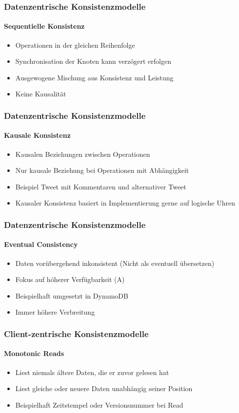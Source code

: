 \begin{frame}
  \frametitle{Datenzentrische Konsistenzmodelle}
  \framesubtitle{Sequentielle Konsistenz}
  \begin{itemize}
    \item Operationen in der gleichen Reihenfolge 
    \item Synchronisation der Knoten kann verzögert erfolgen
    \item Ausgewogene Mischung aus Konsistenz und Leistung  
    \item Keine Kausalität
  \end{itemize}
\end{frame}


\begin{frame}
  \frametitle{Datenzentrische Konsistenzmodelle}
  \framesubtitle{Kausale Konsistenz}
  \begin{itemize}
    \item Kausalen Beziehungen zwischen Operationen
    \item Nur kausale Beziehung bei Operationen mit Abhängigkeit
    \item Beispiel Tweet mit Kommentaren und alternativer Tweet 
    \item Kausaler Konsistenz basiert in Implementierung gerne auf logische Uhren
  \end{itemize}
\end{frame}

\begin{frame}
  \frametitle{Datenzentrische Konsistenzmodelle}
  \framesubtitle{Eventual Consistency}
  \begin{itemize}
    \item Daten vorübergehend inkonsistent (Nicht als eventuell übersetzen)
    \item Fokus auf höherer Verfügbarkeit (A)
    \item Beispielhaft umgesetzt in DynamoDB
    \item Immer höhere Verbreitung
  \end{itemize}
\end{frame}


\begin{frame}
  \frametitle{Client-zentrische Konsistenzmodelle}
  \framesubtitle{Monotonic Reads}
  \begin{itemize}
    \item Liest niemals ältere Daten, die er zuvor gelesen hat 
    \item Liest gleiche oder neuere Daten unabhängig seiner Position
    \item Beispielhaft Zeitstempel oder Versionsnummer bei Read
  \end{itemize}
\end{frame}


